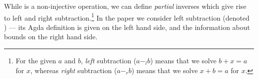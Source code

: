 While  is a non-injective operation, we can define \emph{partial}
inverses which give rise to left and right subtraction.\footnote{
For the given $a$ and $b$, \emph{left} subtraction ($a -_{l} b$) means that we
solve $b + x = a$ for $x$, whereas \emph{right} subtraction ($a -_{r} b$)
means that we solve $x + b = a$ for $x$.
}
In the paper we consider left subtraction (denoted ) --- its
Agda definition is given on the left hand side, and the information about
bounds on the right hand side.
